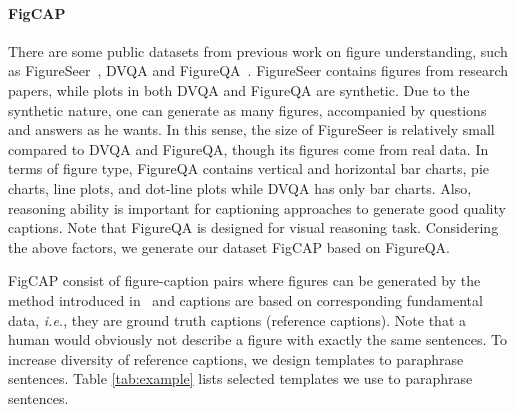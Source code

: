 \documentclass[11pt,a4paper]{article}
\begin{document}
\paragraph{FigCAP} There are some public datasets from previous work on figure understanding, such as FigureSeer~\cite{siegel2016figureseer}, DVQA\cite{kafle2018dvqa} and FigureQA~\cite{kahou2017figureqa}. FigureSeer contains figures from research papers, while plots in both DVQA and FigureQA are synthetic. Due to the synthetic nature, one can generate as many figures, accompanied by questions and answers as he wants. In this sense, the size of FigureSeer is relatively small compared to DVQA and FigureQA, though its figures come from real data. In terms of figure type, FigureQA contains vertical and horizontal bar charts, pie charts, line plots, and dot-line plots while DVQA has only bar charts. Also, reasoning ability is important for captioning approaches to generate good quality captions. Note that FigureQA is designed for visual reasoning task. Considering the above factors, we generate our dataset FigCAP based on FigureQA. 

FigCAP consist of figure-caption pairs where figures can be generated by the method introduced in~\cite{kahou2017figureqa} and captions are based on corresponding fundamental data, \emph{i.e.}, they are ground truth captions (reference captions). 
Note that a human would obviously not describe a figure with exactly the same sentences. 
To increase diversity of reference captions, we design templates to paraphrase sentences. Table \ref{tab:example} lists selected templates we use to paraphrase sentences. 
\end{document}
